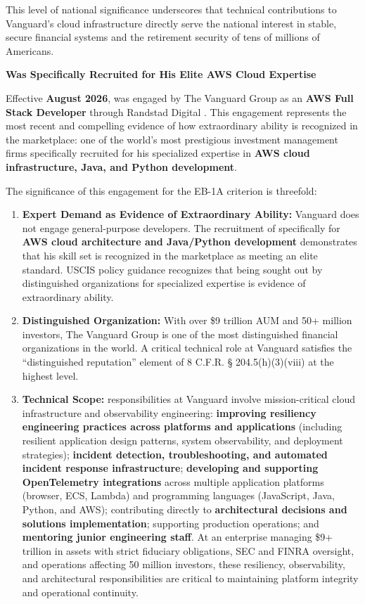This level of national significance underscores that technical contributions to Vanguard's cloud infrastructure directly serve the national interest in stable, secure financial systems and the retirement security of tens of millions of Americans.

\textbf{\dr Was Specifically Recruited for His Elite AWS Cloud Expertise}

Effective \textbf{August 2026}, \dr was engaged by The Vanguard Group as an \textbf{AWS Full Stack Developer} through Randstad Digital \cite{CR13, CR14}. This engagement represents the most recent and compelling evidence of how \drs extraordinary ability is recognized in the marketplace: one of the world's most prestigious investment management firms specifically recruited \dr for his specialized expertise in \textbf{AWS cloud infrastructure, Java, and Python development}.

The significance of this engagement for the EB-1A criterion is threefold:

\begin{enumerate}
    \item \textbf{Expert Demand as Evidence of Extraordinary Ability:} Vanguard does not engage general-purpose developers. The recruitment of \dr specifically for \textbf{AWS cloud architecture and Java/Python development} demonstrates that his skill set is recognized in the marketplace as meeting an elite standard. USCIS policy guidance recognizes that being sought out by distinguished organizations for specialized expertise is evidence of extraordinary ability.

    \item \textbf{Distinguished Organization:} With over \$9 trillion AUM and 50+ million investors, The Vanguard Group is one of the most distinguished financial organizations in the world. A critical technical role at Vanguard satisfies the ``distinguished reputation'' element of 8 C.F.R. § 204.5(h)(3)(viii) at the highest level.

    \item \textbf{Technical Scope:} \drs responsibilities at Vanguard involve mission-critical cloud infrastructure and observability engineering: \textbf{improving resiliency engineering practices across platforms and applications} (including resilient application design patterns, system observability, and deployment strategies); \textbf{incident detection, troubleshooting, and automated incident response infrastructure}; \textbf{developing and supporting OpenTelemetry integrations} across multiple application platforms (browser, ECS, Lambda) and programming languages (JavaScript, Java, Python, and AWS); contributing directly to \textbf{architectural decisions and solutions implementation}; supporting production operations; and \textbf{mentoring junior engineering staff}. At an enterprise managing \$9+ trillion in assets with strict fiduciary obligations, SEC and FINRA oversight, and operations affecting 50 million investors, these resiliency, observability, and architectural responsibilities are critical to maintaining platform integrity and operational continuity.
\end{enumerate}

